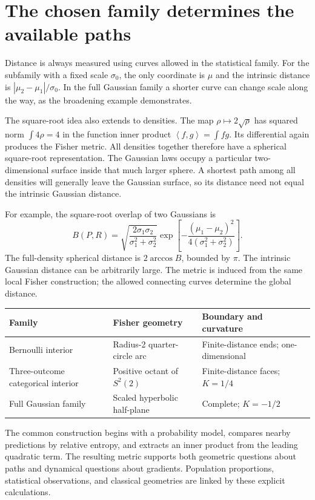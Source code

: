 \documentclass[11pt,oneside,openany]{book}
\theoremstyle{definition}
\theoremstyle{remark}
\newcommand{\ip}[2]{\left\langle #1,#2\right\rangle}
\numberwithin{equation}{chapter}
\begin{document}
\section{The chosen family determines the available paths}
Distance is always measured using curves allowed in the statistical family. For the subfamily with a fixed scale $\sigma_0$, the only coordinate is $\mu$ and the intrinsic distance is $|\mu_2-\mu_1|/\sigma_0$. In the full Gaussian family a shorter curve can change scale along the way, as the broadening example demonstrates.

The square-root idea also extends to densities. The map $\rho\mapsto2\sqrt\rho$ has squared norm $\int4\rho=4$ in the function inner product $\ip{f}{g}=\int fg$. Its differential again produces the Fisher metric. All densities together therefore have a spherical square-root representation. The Gaussian laws occupy a particular two-dimensional surface inside that much larger sphere. A shortest path among all densities will generally leave the Gaussian surface, so its distance need not equal the intrinsic Gaussian distance.

For example, the square-root overlap of two Gaussians is
\[
B(P,R)=\sqrt{\frac{2\sigma_1\sigma_2}{\sigma_1^2+\sigma_2^2}}
\exp\left[-\frac{(\mu_1-\mu_2)^2}{4(\sigma_1^2+\sigma_2^2)}\right].
\]
The full-density spherical distance is $2\arccos B$, bounded by $\pi$. The intrinsic Gaussian distance can be arbitrarily large. The metric is induced from the same local Fisher construction; the allowed connecting curves determine the global distance.

\begin{center}
\begin{tabular}{@{}L{.26\textwidth}L{.36\textwidth}L{.27\textwidth}@{}}
\toprule
Family & Fisher geometry & Boundary and curvature\\\midrule
Bernoulli interior & Radius-2 quarter-circle arc & Finite-distance ends; one-dimensional\\[5pt]
Three-outcome categorical interior & Positive octant of $S^2(2)$ & Finite-distance faces; $K=1/4$\\[5pt]
Full Gaussian family & Scaled hyperbolic half-plane & Complete; $K=-1/2$\\
\bottomrule
\end{tabular}
\end{center}
The common construction begins with a probability model, compares nearby predictions by relative entropy, and extracts an inner product from the leading quadratic term. The resulting metric supports both geometric questions about paths and dynamical questions about gradients. Population proportions, statistical observations, and classical geometries are linked by these explicit calculations.
\end{document}
